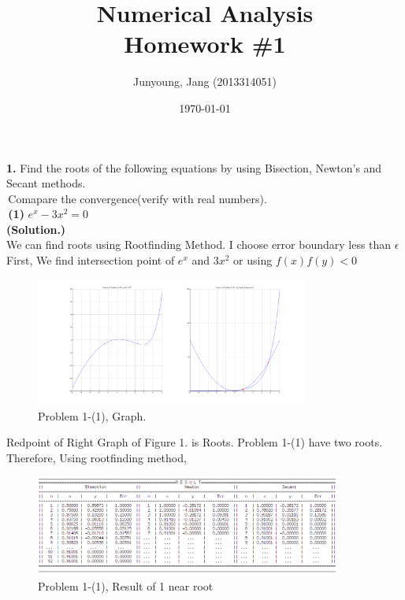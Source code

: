 \documentclass[10pt]{article}
\title{Numerical Analysis\\ Homework \#1}
\author{Junyoung, Jang (2013314051)}
\date{\today}
\begin{document}
\maketitle
	\begin{flushleft}
 	\textbf{1.} Find the roots of the following equations by using Bisection, Newton's and Secant methods.\\
 	\quad\,Comapare the convergence(verify with real numbers).\\
 	\quad\,\textbf{(1)} $e^x -3x^2=0$\\
 	\;
 	\qquad \quad \textbf{(Solution.)} \\
	\qquad \quad We can find roots using Rootfinding Method. I choose error boundary less than $\epsilon$\\ 
	\qquad \quad First, We find intersection point of $e^x$ and $3x^2$ or using $f(x)f(y)<0$\\
	\begin{figure}[!h]
		\centering
		\begin{center}
		\includegraphics[width=0.8\textwidth]{1-1.png}
		\caption{Problem 1-(1), Graph.}
		\end{center}
	\end{figure}
	\qquad \quad Redpoint of Right Graph of Figure 1. is Roots. Problem 1-(1) have two roots.\\
	\qquad \quad Therefore, Using rootfinding method,\\
	\begin{figure}[!h]
		\centering
		\begin{center}
		\includegraphics[width=0.9\textwidth]{1-1-r1.png}
		\caption{Problem 1-(1), Result of 1 near root }

\end{center}
\end{figure}
\end{flushleft}
\end{document}
